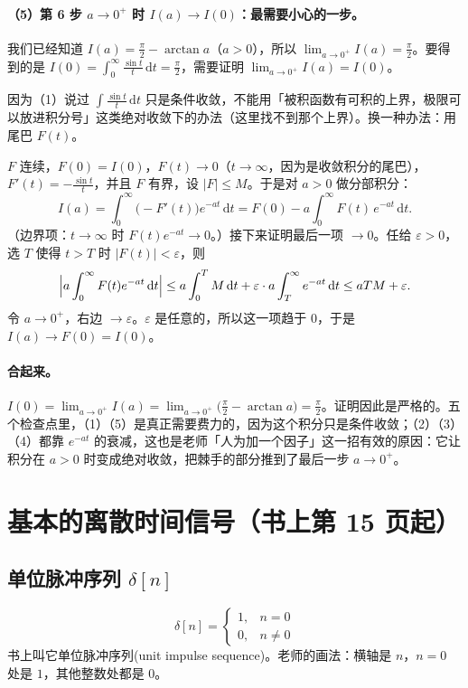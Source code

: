 \documentclass[UTF8,a4paper,11pt]{ctexart}
\renewcommand{\d}{\,\mathrm{d}}
\begin{document}
\paragraph{（5）第 6 步 $a\to0^{+}$ 时 $I(a)\to I(0)$：最需要小心的一步。}
我们已经知道 $I(a)=\frac\pi2-\arctan a$（$a>0$），所以 $\lim_{a\to0^+}I(a)=\frac\pi2$。要得到的是 $I(0)=\int_0^\infty\frac{\sin t}{t}\d t=\frac\pi2$，需要证明 $\lim_{a\to0^+}I(a)=I(0)$。

因为（1）说过 $\int\frac{\sin t}{t}\d t$ 只是条件收敛，不能用「被积函数有可积的上界，极限可以放进积分号」这类绝对收敛下的办法（这里找不到那个上界）。换一种办法：用尾巴 $F(t)$。

$F$ 连续，$F(0)=I(0)$，$F(t)\to0$（$t\to\infty$，因为是收敛积分的尾巴），$F'(t)=-\frac{\sin t}{t}$，并且 $F$ 有界，设 $|F|\le M$。于是对 $a>0$ 做分部积分：
\[
I(a)=\int_0^\infty\bigl(-F'(t)\bigr)e^{-at}\d t=F(0)-a\int_0^\infty F(t)\,e^{-at}\d t .
\]
（边界项：$t\to\infty$ 时 $F(t)e^{-at}\to0$。）接下来证明最后一项 $\to0$。任给 $\varepsilon>0$，选 $T$ 使得 $t>T$ 时 $|F(t)|<\varepsilon$，则
\[
\Bigl|a\int_0^\infty F(t)e^{-at}\d t\Bigr|
\le a\int_0^T M\d t+\varepsilon\cdot a\int_T^\infty e^{-at}\d t
\le aTM+\varepsilon .
\]
令 $a\to0^+$，右边 $\to\varepsilon$。$\varepsilon$ 是任意的，所以这一项趋于 $0$，于是 $I(a)\to F(0)=I(0)$。

\paragraph{合起来。}
$I(0)=\lim_{a\to0^+}I(a)=\lim_{a\to0^+}\bigl(\frac\pi2-\arctan a\bigr)=\frac\pi2$。证明因此是严格的。五个检查点里，（1）（5）是真正需要费力的，因为这个积分只是条件收敛；（2）（3）（4）都靠 $e^{-at}$ 的衰减，这也是老师「人为加一个因子」这一招有效的原因：它让积分在 $a>0$ 时变成绝对收敛，把棘手的部分推到了最后一步 $a\to0^+$。

\section{基本的离散时间信号（书上第 15 页起）}

\subsection{单位脉冲序列 $\delta[n]$}
\[
\delta[n]=\begin{cases}1,&n=0\\0,&n\neq0\end{cases}
\]
书上叫它单位脉冲序列(unit impulse sequence)。老师的画法：横轴是 $n$，$n=0$ 处是 $1$，其他整数处都是 $0$。
\end{document}
